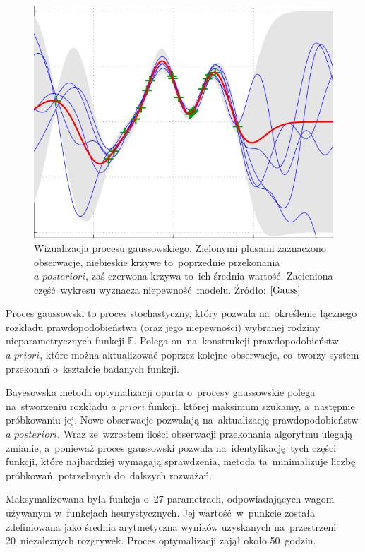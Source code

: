 \documentclass[declaration,shortabstract,inz]{iithesis}
\begin{document}
\begin{figure}[H]
	\centering
	\captionsetup{format=hang}
	\includegraphics[width=.98\textwidth,height=\textheight,keepaspectratio]{Gauss.png}
	\caption[Caption]{Wizualizacja procesu gaussowskiego. Zielonymi plusami zaznaczono obserwacje, niebieskie krzywe to~poprzednie przekonania $\textit{a posteriori}$, zaś czerwona krzywa to~ich średnia wartość. Zacieniona część wykresu wyznacza niepewność modelu. Żródło: $\cite{Gauss}$}
	\label{fig:Gauss}
\end{figure}

Proces gaussowski to proces stochastyczny, który pozwala na~określenie łącznego rozkładu prawdopodobieństwa (oraz jego niepewności) wybranej rodziny nieparametrycznych funkcji $\mathbb{F}$. Polega on~na~konstrukcji prawdopodobieństw $\textit{a priori}$, które można aktualizować poprzez kolejne obserwacje, co~tworzy system przekonań o~kształcie badanych funkcji.

Bayesowska metoda optymalizacji oparta o~procesy gaussowskie polega na~stworzeniu rozkładu $\textit{a priori}$ funkcji, której maksimum szukamy, a~następnie próbkowaniu jej. Nowe obserwacje pozwalają na~aktualizację prawdopodobieństw $\textit{a posteriori}$. Wraz ze~wzrostem ilości obserwacji przekonania algorytmu ulegają zmianie, a~ponieważ proces gaussowski pozwala na~identyfikację tych części funkcji, które najbardziej wymagają sprawdzenia, metoda ta~minimalizuje liczbę próbkowań, potrzebnych do~dalszych rozważań.

Maksymalizowana była funkcja o~27 parametrach, odpowiadających wagom używanym w~funkcjach heurystycznych. Jej wartość w~punkcie została zdefiniowana jako średnia arytmetyczna wyników uzyskanych na~przestrzeni 20~niezależnych rozgrywek. Proces optymalizacji zajął około 50~godzin.
\end{document}
